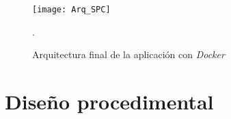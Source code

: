 \begin{figure}[H]
	\centering
	\texttt{[image: Arq\_SPC]}
	\caption{Arquitectura final de la aplicación con \emph{Docker}}.
	\label{fig:Arq_SPC}
\end{figure}

\section{Diseño procedimental}









